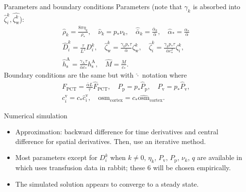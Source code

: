 \documentclass{beamer}
\begin{document}
\begin{frame}{Parameters and boundary conditions}
    Parameters (note that $\gamma_k$ is absorbed into $\hat{\zeta}^k_i,\hat{\zeta^k_{\mathrm{w}}}$):
    \begin{gather*}
        \hat{\rho}_{k} = \frac{8\pi\eta_{k}}{\rho_*},\quad 
        \hat{\nu}_k = p_*\nu_k,\quad \hat{\bar{\alpha}}_{k} = \frac{\bar{\alpha}_{k}}{\bar{\alpha}},\quad \hat{\alpha}_* = \frac{\alpha_*}{\bar{\alpha}}\\
        \hat{D}_i^{k} = \frac{\tau}{L^2}D_i^{k},\quad 
        \hat{\zeta}_\mathrm{w}^k = \frac{\gamma_k p_*\tau}{\bar{\alpha}}\zeta_\mathrm{w}^k,\quad\hat{\zeta}_i^k = \frac{\gamma_kp_*\tau}{\bar{\alpha}c_*^2}\zeta_i^k,\\
        \hat{h}_\mathrm{s}^\mathrm{A} = \frac{\gamma_\mathrm{A}\tau}{\bar{\alpha}c_*}h_\mathrm{s}^\mathrm{A},\quad \hat{M} = \frac{M}{c_*}.
    \end{gather*}
    Boundary conditions are the same but with $\hat{\cdot}$ notation where
    \begin{gather*}
        F_\mathrm{PCT} = \frac{\bar{\alpha}L}{\tau}\hat{F}_\mathrm{PCT},\quad
        P_\mathrm{p} = p_*\hat{P}_\mathrm{p},\quad
        P_\mathrm{v} = p_*\hat{P}_\mathrm{v},\\
        c_i^\mathrm{v} = c_*\hat{c}_i^\mathrm{v},\quad \mathrm{osm}_\mathrm{cortex} = c_*\widehat{\mathrm{osm}}_\mathrm{cortex}.
    \end{gather*}

\end{frame}

\begin{frame}{Numerical simulation}
    \begin{itemize}
        \item Approximation: backward difference for time derivatives and central difference for spatial derivatives. Then, use an iterative method.
        \item Most parameters except for $D_i^k$ when $k\neq 0$, $\eta_k$, $P_\mathrm{v}$, $P_\mathrm{p}$, $\nu_k$, $q$ are available in \cite{Stephenson1987,Stephenson1989} which uses transfusion data in rabbit; these 6 will be chosen empirically.
        \item The simulated solution appears to converge to a steady state.
    \end{itemize}
\end{frame}
\end{document}
